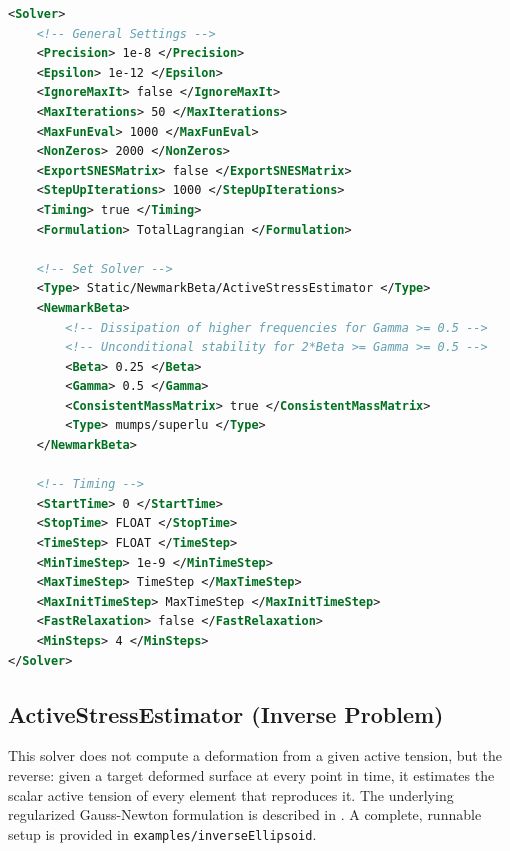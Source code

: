 \begin{lstlisting}[language=XML,caption=.xml settings for the solver class]
<Solver>
    <!-- General Settings -->
    <Precision> 1e-8 </Precision>
    <Epsilon> 1e-12 </Epsilon>
    <IgnoreMaxIt> false </IgnoreMaxIt>
    <MaxIterations> 50 </MaxIterations>
    <MaxFunEval> 1000 </MaxFunEval>
    <NonZeros> 2000 </NonZeros>
    <ExportSNESMatrix> false </ExportSNESMatrix>
    <StepUpIterations> 1000 </StepUpIterations>
    <Timing> true </Timing>
    <Formulation> TotalLagrangian </Formulation>

    <!-- Set Solver -->
    <Type> Static/NewmarkBeta/ActiveStressEstimator </Type>
    <NewmarkBeta>
        <!-- Dissipation of higher frequencies for Gamma >= 0.5 -->
        <!-- Unconditional stability for 2*Beta >= Gamma >= 0.5 -->
        <Beta> 0.25 </Beta>
        <Gamma> 0.5 </Gamma>
        <ConsistentMassMatrix> true </ConsistentMassMatrix>
        <Type> mumps/superlu </Type>
    </NewmarkBeta>

    <!-- Timing -->
    <StartTime> 0 </StartTime>
    <StopTime> FLOAT </StopTime>
    <TimeStep> FLOAT </TimeStep>
    <MinTimeStep> 1e-9 </MinTimeStep>
    <MaxTimeStep> TimeStep </MaxTimeStep>
    <MaxInitTimeStep> MaxTimeStep </MaxInitTimeStep>
    <FastRelaxation> false </FastRelaxation>
    <MinSteps> 4 </MinSteps>
</Solver>
\end{lstlisting}

\subsection{ActiveStressEstimator (Inverse Problem)}
\label{settings:ActiveStressEstimator}

This solver does not compute a deformation from a given active tension, but the reverse: given a target deformed surface at every point in time, it estimates the scalar active tension of every element that reproduces it.
The underlying regularized Gauss-Newton formulation is described in .
A complete, runnable setup is provided in \verb|examples/inverseEllipsoid|.

